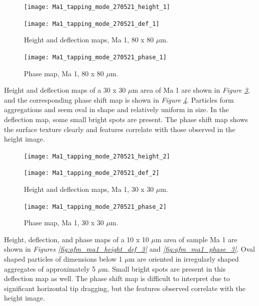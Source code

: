 \begin{figure}[H]
\centering
\begin{minipage}{.45\textwidth}
  \centering
  \texttt{[image: Ma1\_tapping\_mode\_270521\_height\_1]}
\end{minipage}
\begin{minipage}{.45\textwidth}
  \centering
  \texttt{[image: Ma1\_tapping\_mode\_270521\_def\_1]}
\end{minipage}
\caption[Height and deflection maps, Ma 1]{Height and deflection maps, Ma 1, 80 x 80 $\mu$m.}
\label{fig:afm_ma1_height_def_1}
\end{figure}

\begin{figure}[H]
\centering
  \texttt{[image: Ma1\_tapping\_mode\_270521\_phase\_1]}
\caption[Phase map, Ma 1]{Phase map, Ma 1, 80 x 80 $\mu$m.}
\label{fig:afm_ma1_phase_1}
\end{figure}

Height and deflection maps of a 30 x 30 $\mu$m area of Ma 1 are shown in \textit{Figure \ref{fig:afm_ma1_height_def_2}}, and the corresponding phase shift map is shown in \textit{Figure \ref{fig:afm_ma1_phase_2}}. Particles form aggregations and seem oval in shape and relatively uniform in size. In the deflection map, some small bright spots are present. The phase shift map shows the surface texture clearly and features correlate with those observed in the height image.


\begin{figure}[H]
\centering
\begin{minipage}{.45\textwidth}
  \centering
  \texttt{[image: Ma1\_tapping\_mode\_270521\_height\_2]}
\end{minipage}
\begin{minipage}{.45\textwidth}
  \centering
  \texttt{[image: Ma1\_tapping\_mode\_270521\_def\_2]}
\end{minipage}
\caption[Height and deflection maps, Ma 1]{Height and deflection maps, Ma 1, 30 x 30 $\mu$m.}
\label{fig:afm_ma1_height_def_2}
\end{figure}

\begin{figure}[H]
\centering
  \texttt{[image: Ma1\_tapping\_mode\_270521\_phase\_2]}
\caption[Phase map, Ma 1]{Phase map, Ma 1, 30 x 30 $\mu$m.}
\label{fig:afm_ma1_phase_2}
\end{figure}

Height, deflection, and phase maps of a 10 x 10 $\mu$m area of sample Ma 1 are shown in \textit{Figures \ref{fig:afm_ma1_height_def_3}} and \textit{\ref{fig:afm_ma1_phase_3}}. Oval shaped particles of dimensions below 1 $\mu$m are oriented in irregularly shaped aggregates of approximately 5 $\mu$m. Small bright spots are present in this deflection map as well. The phase shift map is difficult to interpret due to significant horizontal tip dragging, but the features observed correlate with the height image.

